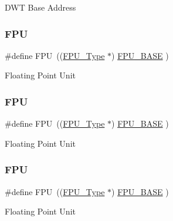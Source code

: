 D\+WT Base Address \mbox{\label{group___c_m_s_i_s__core__base_gabc7c93f2594e85ece1e1a24f10591428}} 
\subsubsection{\texorpdfstring{FPU}{FPU}\hspace{0.1cm}{\footnotesize\ttfamily [1/4]}}
{\footnotesize\ttfamily \#define F\+PU~((\mbox{\hyperlink{struct_f_p_u___type}{F\+P\+U\+\_\+\+Type}}       $\ast$)     \mbox{\hyperlink{group___c_m_s_i_s__core__base_ga4dcad4027118c098c07bcd575f1fbb28}{F\+P\+U\+\_\+\+B\+A\+SE}}      )}

Floating Point Unit \mbox{\label{group___c_m_s_i_s__core__base_gabc7c93f2594e85ece1e1a24f10591428}} 
\subsubsection{\texorpdfstring{FPU}{FPU}\hspace{0.1cm}{\footnotesize\ttfamily [2/4]}}
{\footnotesize\ttfamily \#define F\+PU~((\mbox{\hyperlink{struct_f_p_u___type}{F\+P\+U\+\_\+\+Type}}       $\ast$)     \mbox{\hyperlink{group___c_m_s_i_s__core__base_ga4dcad4027118c098c07bcd575f1fbb28}{F\+P\+U\+\_\+\+B\+A\+SE}}      )}

Floating Point Unit \mbox{\label{group___c_m_s_i_s__core__base_gabc7c93f2594e85ece1e1a24f10591428}} 
\subsubsection{\texorpdfstring{FPU}{FPU}\hspace{0.1cm}{\footnotesize\ttfamily [3/4]}}
{\footnotesize\ttfamily \#define F\+PU~((\mbox{\hyperlink{struct_f_p_u___type}{F\+P\+U\+\_\+\+Type}}       $\ast$)     \mbox{\hyperlink{group___c_m_s_i_s__core__base_ga4dcad4027118c098c07bcd575f1fbb28}{F\+P\+U\+\_\+\+B\+A\+SE}}         )}

Floating Point Unit \mbox{\label{group___c_m_s_i_s__core__base_gabc7c93f2594e85ece1e1a24f10591428}} 
